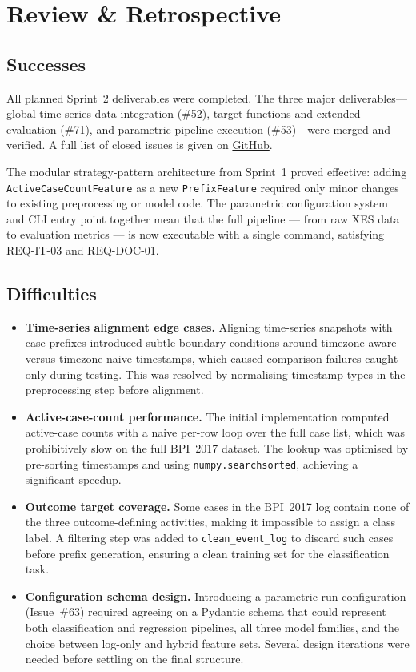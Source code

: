 \documentclass[runningheads]{llncs}
\begin{document}
\section{Review \& Retrospective}

\subsection{Successes}

All planned Sprint~2 deliverables were completed. The three major deliverables---global time-series data integration (\#52), target functions and extended evaluation (\#71), and parametric pipeline execution (\#53)---were merged and verified. A full list of closed issues is given on \href{https://github.com/durki007/spi-time-series/milestone/2?closed=1}{GitHub}.

The modular strategy-pattern architecture from Sprint~1 proved effective: adding \texttt{ActiveCaseCountFeature} as a new \texttt{PrefixFeature} required only minor changes to existing preprocessing or model code. The parametric configuration system and CLI entry point together mean that the full pipeline --- from raw XES data to evaluation metrics --- is now executable with a single command, satisfying REQ-IT-03 and REQ-DOC-01.

\subsection{Difficulties}

\begin{itemize}
    \item \textbf{Time-series alignment edge cases.} Aligning time-series snapshots with case prefixes introduced subtle boundary conditions around timezone-aware versus timezone-naive timestamps, which caused comparison failures caught only during testing. This was resolved by normalising timestamp types in the preprocessing step before alignment.

    \item \textbf{Active-case-count performance.} The initial implementation computed active-case counts with a naive per-row loop over the full case list, which was prohibitively slow on the full BPI~2017 dataset. The lookup was optimised by pre-sorting timestamps and using \texttt{numpy.searchsorted}, achieving a significant speedup.

    \item \textbf{Outcome target coverage.} Some cases in the BPI~2017 log contain none of the three outcome-defining activities, making it impossible to assign a class label. A filtering step was added to \texttt{clean\_event\_log} to discard such cases before prefix generation, ensuring a clean training set for the classification task.

    \item \textbf{Configuration schema design.} Introducing a parametric run configuration (Issue~\#63) required agreeing on a Pydantic schema that could represent both classification and regression pipelines, all three model families, and the choice between log-only and hybrid feature sets. Several design iterations were needed before settling on the final structure.
\end{itemize}
\end{document}
